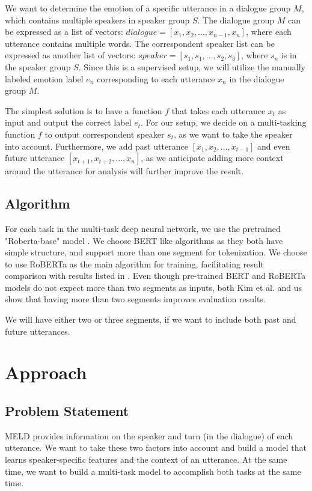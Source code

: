 \documentclass[11pt]{article}
\begin{document}
We want to determine the emotion of a specific utterance in a dialogue group $M$, which contains multiple speakers in speaker group $S$. The dialogue group $M$ can be expressed as a list of vectors: $dialogue = [x_1, x_2, ..., x_{n-1}, x_n]$, where each utterance contains multiple words. The correspondent speaker list can be expressed as another list of vectors: $speaker = [s_1, s_1, ..., s_2, s_3]$, where $s_n$ is in the speaker group $S$. Since this is a supervised setup, we will utilize the manually labeled emotion label $e_n$ corresponding to each utterance $x_n$ in the dialogue group $M$.

The simplest solution is to have a function $f$ that takes each utterance $x_t$ as input and output the correct label $e_t$. For our setup, we decide on a multi-tasking function $f$ to output correspondent speaker $s_t$, as we want to take the speaker into account. Furthermore, we add past utterance $[x_1, x_2, ..., x_{t-1}]$ and even future utterance $[x_{t+1}, x_{t+2}, ..., x_n]$, as we anticipate adding more context around the utterance for analysis will further improve the result.


\subsection{Algorithm}

For each task in the multi-task deep neural network, we use the pretrained "Roberta-base" model \citet{liu-etal-2019-multi}. We choose BERT like algorithms as they both have simple structure, and support more than one segment for tokenization. We choose to use RoBERTa as the main algorithm for training, facilitating result comparison with results listed in \citet{kim-2021-emoberta}. Even though pre-trained BERT and RoBERTa models do not expect more than two segments as inputs, both Kim et al. and us show that having more than two segments improves evaluation results.

We will have either two or three segments, if we want to include both past and future utterances.


\section{Approach}
\label{sec:approach}

\subsection{Problem Statement}
MELD provides information on the speaker and turn (in the dialogue) of each utterance. We want to take these two factors into account and build a model that learns speaker-specific features and the context of an utterance. At the same time, we want to build a multi-task model to accomplish both tasks at the same time.
\end{document}
